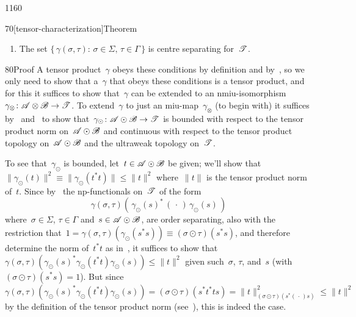 \begin{parsec}{1160}
\begin{point}{70}[tensor-characterization]{Theorem}
\begin{enumerate}
For all~$\sigma\in \Sigma$ and $\tau\in\Gamma$
the product functional $\gamma(\sigma,\tau)\colon \scrT\to\C$
exists
(see~)
 and is positive.
\item
The set
$\{\,\gamma(\sigma,\tau)\colon\,\sigma\in\Sigma,\,\tau\in \Gamma\,\}$
is centre separating for~$\mathscr{T}$.
\end{enumerate}
\spacingfix%
\begin{point}{80}{Proof}%
A tensor product~$\gamma$
obeys these conditions
by definition and by~,
so we only need to show that
a~$\gamma$ that obeys these conditions is a tensor product,
and for this it
suffices to show that~$\gamma$ can be extended
to an nmiu-isomorphism $\gamma_\otimes \colon \mathscr{A}\otimes\mathscr{B}\to \mathscr{T}$.
To extend~$\gamma$ to just an miu-map~$\gamma_\otimes$
(to begin with)
it suffices by~
and~ 
to show that~$\gamma_\odot\colon \mathscr{A}\odot\mathscr{B}\to\mathscr{T}$
is bounded with respect to the tensor product norm
on~$\mathscr{A}\odot\mathscr{B}$
and continuous with respect to the tensor product
topology on~$\mathscr{A}\odot \mathscr{B}$ and the ultraweak topology on~$\mathscr{T}$.

To see that~$\gamma_\odot$
is bounded, 
let~$t\in \mathscr{A}\odot\mathscr{B}$ be given;
we'll show
that~$\|\gamma_\odot(t)\|^2
\equiv \|\gamma_\odot(t^*t)\|\leq \|t\|^2$
where~$\|t\|$ is the tensor product norm of~$t$.
Since by~
the np-functionals on~$\mathscr{T}$
of the form
\begin{equation}
	\label{tensor-characterization-1}	
	\gamma(\sigma,\tau)(\,\gamma_\odot(s)^*\,
(\,\cdot\,)\,\gamma_\odot(s)\,)
\end{equation}
where~$\sigma\in\Sigma$, $\tau\in\Gamma$
and~$s\in\mathscr{A}\odot\mathscr{B}$,
are order separating,
also with  the restriction
that~$1=\gamma(\sigma,\tau)(\gamma_\odot(s^*s))\equiv
(\sigma\odot\tau)(s^*s)$,
and therefore determine the norm of~$t^*t$ as in~,
it suffices to show that
$\gamma(\sigma,\tau)(\gamma_\odot(s)^* \gamma_\odot(t^*t)
\gamma_\odot(s)) \leq \|t\|^2$
given such~$\sigma$, $\tau$, and~$s$
(with $(\sigma\odot \tau)(s^*s)=1$).
But since $
\gamma(\sigma,\tau)(\gamma_\odot(s)^* \gamma_\odot(t^*t)\gamma_\odot(s)) =
(\sigma\odot\tau)(s^* t^*t s)
= \|t\|_{(\sigma\odot\tau)(s^*(\,\cdot\,)s)}^2
\leq \|t\|^2$
by the definition of the tensor product norm
(see~),
this is indeed the case.


\end{point}
\end{point}
\end{parsec}
